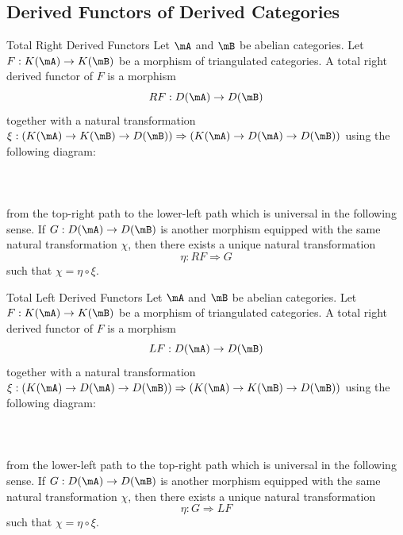 \documentclass[a4paper]{article}
\begin{document}
\subsection{Derived Functors of Derived Categories}
\begin{defn}{Total Right Derived Functors}{} Let $\mA$ and $\mB$ be abelian categories. Let $F:K(\mA)\to K(\mB)$ be a morphism of triangulated categories. A total right derived functor of $F$ is a morphism $$RF:D(\mA)\to D(\mB)$$ together with a natural transformation $\xi:(K(\mA)\to K(\mB)\to D(\mB))\Rightarrow(K(\mA)\to D(\mA)\to D(\mB))$ using the following diagram: \\~\\
\\~\\
from the top-right path to the lower-left path which is universal in the following sense. If $G:D(\mA)\to D(\mB)$ is another morphism equipped with the same natural transformation $\chi$, then there exists a unique natural transformation $$\eta:RF\Rightarrow G$$ such that $\chi=\eta\circ\xi$. 
\end{defn}

\begin{defn}{Total Left Derived Functors}{} Let $\mA$ and $\mB$ be abelian categories. Let $F:K(\mA)\to K(\mB)$ be a morphism of triangulated categories. A total right derived functor of $F$ is a morphism $$LF:D(\mA)\to D(\mB)$$ together with a natural transformation $\xi:(K(\mA)\to D(\mA)\to D(\mB))\Rightarrow(K(\mA)\to K(\mB)\to D(\mB))$ using the following diagram: \\~\\
\\~\\
from the lower-left path to the top-right path which is universal in the following sense. If $G:D(\mA)\to D(\mB)$ is another morphism equipped with the same natural transformation $\chi$, then there exists a unique natural transformation $$\eta:G\Rightarrow LF$$ such that $\chi=\eta\circ\xi$. 
\end{defn}
\end{document}
